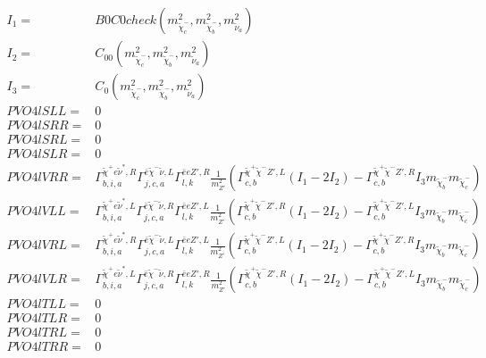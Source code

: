 \documentclass[A4,landscape]{article}
\begin{document}
\begin{align} 
I_1= & B0C0check(m^2_{\tilde{\chi}^-_{{c}}}, m^2_{\tilde{\chi}^-_{{b}}}, m^2_{\tilde{\nu}_{{a}}}) \\ 
I_2= & C_{00}(m^2_{\tilde{\chi}^-_{{c}}}, m^2_{\tilde{\chi}^-_{{b}}}, m^2_{\tilde{\nu}_{{a}}}) \\ 
I_3= & C_0(m^2_{\tilde{\chi}^-_{{c}}}, m^2_{\tilde{\chi}^-_{{b}}}, m^2_{\tilde{\nu}_{{a}}}) \\ 
  PVO4lSLL= & 0 \\ 
  PVO4lSRR= & 0 \\ 
  PVO4lSRL= & 0 \\ 
  PVO4lSLR= & 0 \\ 
  PVO4lVRR= &  \Gamma^{\tilde{\chi}^+e \tilde{\nu}^*,R}_{b, i, a} \Gamma^{\bar{e}\tilde{\chi}^- \tilde{\nu} ,L}_{j, c, a} \Gamma^{\bar{e}e {Z'} ,R}_{l, k} \frac{1}{m^2_{{Z'}}} (\Gamma^{\tilde{\chi}^+\tilde{\chi}^- {Z'} ,L}_{c, b} (I_1 - 2 I_2) - \Gamma^{\tilde{\chi}^+\tilde{\chi}^- {Z'} ,R}_{c, b} I_3 m_{\tilde{\chi}^-_{{b}}} m_{\tilde{\chi}^-_{{c}}}) \\ 
  PVO4lVLL= &  \Gamma^{\tilde{\chi}^+e \tilde{\nu}^*,L}_{b, i, a} \Gamma^{\bar{e}\tilde{\chi}^- \tilde{\nu} ,R}_{j, c, a} \Gamma^{\bar{e}e {Z'} ,L}_{l, k} \frac{1}{m^2_{{Z'}}} (\Gamma^{\tilde{\chi}^+\tilde{\chi}^- {Z'} ,R}_{c, b} (I_1 - 2 I_2) - \Gamma^{\tilde{\chi}^+\tilde{\chi}^- {Z'} ,L}_{c, b} I_3 m_{\tilde{\chi}^-_{{b}}} m_{\tilde{\chi}^-_{{c}}}) \\ 
  PVO4lVRL= &  \Gamma^{\tilde{\chi}^+e \tilde{\nu}^*,R}_{b, i, a} \Gamma^{\bar{e}\tilde{\chi}^- \tilde{\nu} ,L}_{j, c, a} \Gamma^{\bar{e}e {Z'} ,L}_{l, k} \frac{1}{m^2_{{Z'}}} (\Gamma^{\tilde{\chi}^+\tilde{\chi}^- {Z'} ,L}_{c, b} (I_1 - 2 I_2) - \Gamma^{\tilde{\chi}^+\tilde{\chi}^- {Z'} ,R}_{c, b} I_3 m_{\tilde{\chi}^-_{{b}}} m_{\tilde{\chi}^-_{{c}}}) \\ 
  PVO4lVLR= &  \Gamma^{\tilde{\chi}^+e \tilde{\nu}^*,L}_{b, i, a} \Gamma^{\bar{e}\tilde{\chi}^- \tilde{\nu} ,R}_{j, c, a} \Gamma^{\bar{e}e {Z'} ,R}_{l, k} \frac{1}{m^2_{{Z'}}} (\Gamma^{\tilde{\chi}^+\tilde{\chi}^- {Z'} ,R}_{c, b} (I_1 - 2 I_2) - \Gamma^{\tilde{\chi}^+\tilde{\chi}^- {Z'} ,L}_{c, b} I_3 m_{\tilde{\chi}^-_{{b}}} m_{\tilde{\chi}^-_{{c}}}) \\ 
  PVO4lTLL= & 0 \\ 
  PVO4lTLR= & 0 \\ 
  PVO4lTRL= & 0 \\ 
  PVO4lTRR= & 0 \\ 
\end{align} 
\end{document}
